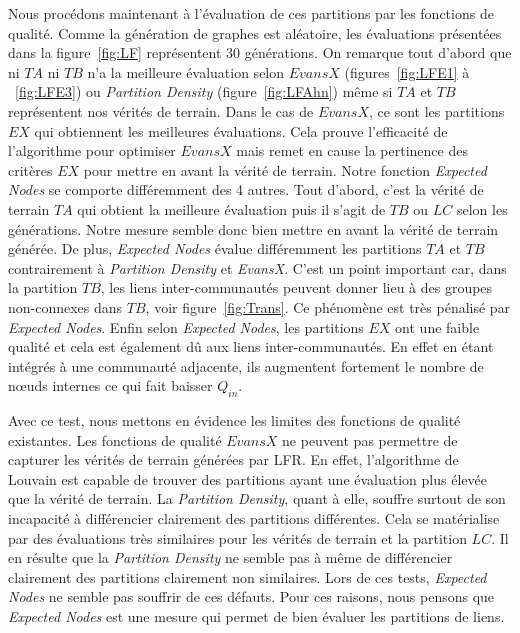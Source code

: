 Nous procédons maintenant à l'évaluation de ces partitions par les fonctions de qualité.
Comme la génération de graphes est aléatoire, les évaluations présentées dans la figure~\ref{fig:LF} représentent $30$ générations.
On remarque tout d'abord que ni $TA$ ni $TB$ n'a la meilleure évaluation selon $EvansX$ (figures~\ref{fig:LFE1} à ~\ref{fig:LFE3}) ou \emph{Partition Density} (figure~\ref{fig:LFAhn}) même si $TA$ et $TB$ représentent nos vérités de terrain.
Dans le cas de $EvansX$, ce sont les partitions $EX$ qui obtiennent les meilleures évaluations.
Cela prouve l'efficacité de l'algorithme pour optimiser $EvansX$ mais remet en cause la pertinence des critères $EX$ pour mettre en avant la vérité de terrain.
Notre fonction \emph{Expected Nodes} se comporte différemment des 4 autres.
Tout d'abord, c'est la vérité de terrain $TA$ qui obtient la meilleure évaluation puis il s'agit de $TB$ ou $LC$ selon les générations.
Notre mesure semble donc bien mettre en avant la vérité de terrain générée.
De plus, \emph{Expected Nodes} évalue différemment les partitions $TA$ et $TB$ contrairement à \emph{Partition Density} et \emph{EvansX}.
C'est un point important car, dans la partition $TB$, les liens inter-communautés peuvent donner lieu à des groupes non-connexes dans $TB$, voir figure~\ref{fig:Trans}.
Ce phénomène est très pénalisé par \emph{Expected Nodes}.
Enfin selon \emph{Expected Nodes}, les partitions $EX$ ont une faible qualité et cela est également dû aux liens inter-communautés.
En effet en étant intégrés à une communauté adjacente, ils augmentent fortement le nombre de n\oe{}uds internes ce qui fait baisser $Q_{in}$.

Avec ce test, nous mettons en évidence les limites des fonctions de qualité existantes.
Les fonctions de qualité $EvansX$ ne peuvent pas permettre de capturer les vérités de terrain générées par LFR.
En effet, l'algorithme de Louvain est capable de trouver des partitions ayant une évaluation plus élevée que la vérité de terrain.
La \emph{Partition Density}, quant à elle, souffre surtout de son incapacité à différencier clairement des partitions différentes.
Cela se matérialise par des évaluations très similaires pour les vérités de terrain et la partition $LC$.
Il en résulte que la \emph{Partition Density} ne semble pas à même de différencier clairement des partitions  clairement non similaires.
Lors de ces tests, \emph{Expected Nodes} ne semble pas souffrir de ces défauts.
Pour ces raisons, nous pensons que \emph{Expected Nodes} est une mesure qui permet de bien évaluer les partitions de liens.

